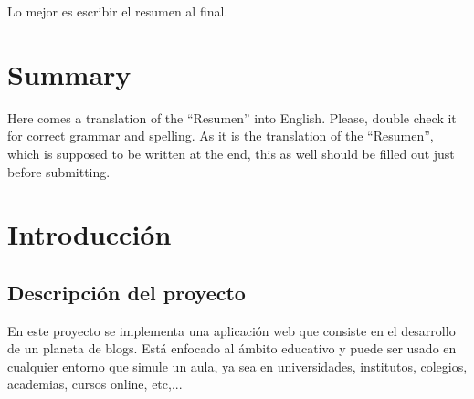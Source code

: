 \documentclass[a4paper, 12pt]{book}
\begin{document}
Lo mejor es escribir el resumen al final.


\chapter*{Summary}

Here comes a translation of the ``Resumen'' into English. Please, double check
it for correct grammar and spelling. As it is the translation of the ``Resumen'',
which is supposed to be written at the end, this as well should be filled out
just before submitting.




\tableofcontents 
\cleardoublepage
{}
{} %
\listoffigures %



\cleardoublepage
\chapter{Introducci\'on}
\label{sec:intro} %

\section{Descripci\'on del proyecto}
\label{sec:descripcion}
En este proyecto se implementa una aplicaci\'on web que consiste en el desarrollo de un planeta de blogs. Est\'a enfocado al \'ambito educativo y puede
ser usado en cualquier entorno que simule un aula, ya sea en universidades, institutos, colegios, academias, cursos online, etc,...
\end{document}
